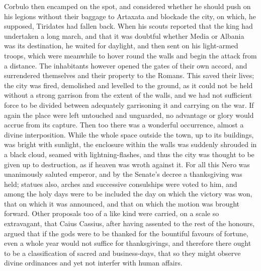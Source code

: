 Corbulo then encamped on the spot, and considered whether he should push on his legions without their baggage to Artaxata and blockade the city, on which, he supposed, Tiridates had fallen back. When his scouts reported that the king had undertaken a long march, and that it was doubtful whether Media or Albania was its destination, he waited for daylight, and then sent on his light-armed troops, which were meanwhile to hover round the walls and begin the attack from a distance. The inhabitants however opened the gates of their own accord, and surrendered themselves and their property to the Romans. This saved their lives; the city was fired, demolished and levelled to the ground, as it could not be held without a strong garrison from the extent of the walls, and we had not sufficient force to be divided between adequately garrisoning it and carrying on the war. If again the place were left untouched and unguarded, no advantage or glory would accrue from its capture. Then too there was a wonderful occurrence, almost a divine interposition. While the whole space outside the town, up to its buildings, was bright with sunlight, the enclosure within the walls was suddenly shrouded in a black cloud, seamed with lightning-flashes, and thus the city was thought to be given up to destruction, as if heaven was wroth against it. For all this Nero was unanimously saluted emperor, and by the Senate's decree a thanksgiving was held; statues also, arches and successive consulships were voted to him, and among the holy days were to be included the day on which the victory was won, that on which it was announced, and that on which the motion was brought forward. Other proposals too of a like kind were carried, on a scale so extravagant, that Caius Cassius, after having assented to the rest of the honours, argued that if the gods were to be thanked for the bountiful favours of fortune, even a whole year would not suffice for thanksgivings, and therefore there ought to be a classification of sacred and business-days, that so they might observe divine ordinances and yet not interfer with human affairs.


